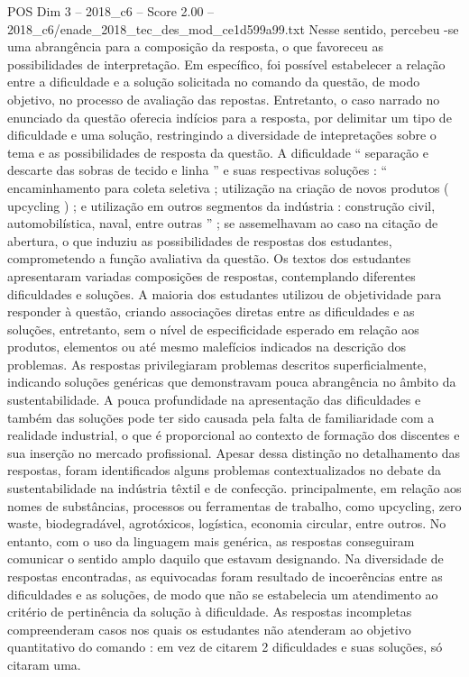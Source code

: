 \begin{textsample}{POS Dim 3 – 2018\_c6 – Score 2.00 – 2018\_c6/enade\_2018\_tec\_des\_mod\_ce1d599a99.txt}
Nesse sentido, percebeu -se uma abrangência para a composição da resposta, o que favoreceu as possibilidades de interpretação.
Em específico, foi possível estabelecer a relação entre a dificuldade e a solução solicitada no comando da questão, de modo objetivo, no processo de avaliação das repostas.
Entretanto, o caso narrado no enunciado da questão oferecia indícios para a resposta, por delimitar um tipo de dificuldade e uma solução, restringindo a diversidade de intepretações sobre o tema e as possibilidades de resposta da questão.
A dificuldade “ separação e descarte das sobras de tecido e linha ” e suas respectivas soluções : “ encaminhamento para coleta seletiva ; utilização na criação de novos produtos ( upcycling ) ; e utilização em outros segmentos da indústria : construção civil, automobilística, naval, entre outras ” ; se assemelhavam ao caso na citação de abertura, o que induziu as possibilidades de respostas dos estudantes, comprometendo a função avaliativa da questão.
Os textos dos estudantes apresentaram variadas composições de respostas, contemplando diferentes dificuldades e soluções.
A maioria dos estudantes utilizou de objetividade para responder à questão, criando associações diretas entre as dificuldades e as soluções, entretanto, sem o nível de especificidade esperado em relação aos produtos, elementos ou até mesmo malefícios indicados na descrição dos problemas.
As respostas privilegiaram problemas descritos superficialmente, indicando soluções genéricas que demonstravam pouca abrangência no âmbito da sustentabilidade.
A pouca profundidade na apresentação das dificuldades e também das soluções pode ter sido causada pela falta de familiaridade com a realidade industrial, o que é proporcional ao contexto de formação dos discentes e sua inserção no mercado profissional.
Apesar dessa distinção no detalhamento das respostas, foram identificados alguns problemas contextualizados no debate da sustentabilidade na indústria têxtil e de confecção. principalmente, em relação aos nomes de substâncias, processos ou ferramentas de trabalho, como upcycling, zero waste, biodegradável, agrotóxicos, logística, economia circular, entre outros.
No entanto, com o uso da linguagem mais genérica, as respostas conseguiram comunicar o sentido amplo daquilo que estavam designando.
Na diversidade de respostas encontradas, as equivocadas foram resultado de incoerências entre as dificuldades e as soluções, de modo que não se estabelecia um atendimento ao critério de pertinência da solução à dificuldade.
As respostas incompletas compreenderam casos nos quais os estudantes não atenderam ao objetivo quantitativo do comando : em vez de citarem 2 dificuldades e suas soluções, só citaram uma.

\end{textsample}
